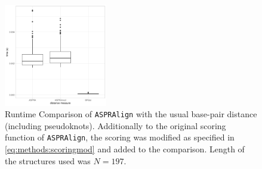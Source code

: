 \documentclass[../../master.tex]{subfiles}
\begin{document}
\begin{figure}[!ht]
	\centering
	\includegraphics[width=0.4\textwidth]{pic/results/aspratest_allconstraints_time.pdf}
	\caption[Structure Distance Measure Runtime]{Runtime Comparison of \texttt{ASPRAlign} with the usual base-pair distance (including pseudoknots). Additionally to the original scoring function of \texttt{ASPRAlign}, the scoring was modified as specified in \autoref{eq:methods:scoringmod} and added to the comparison. Length of the structures used was $N=197$.
	}\label{fig:distruntime}
\end{figure}
\end{document}
